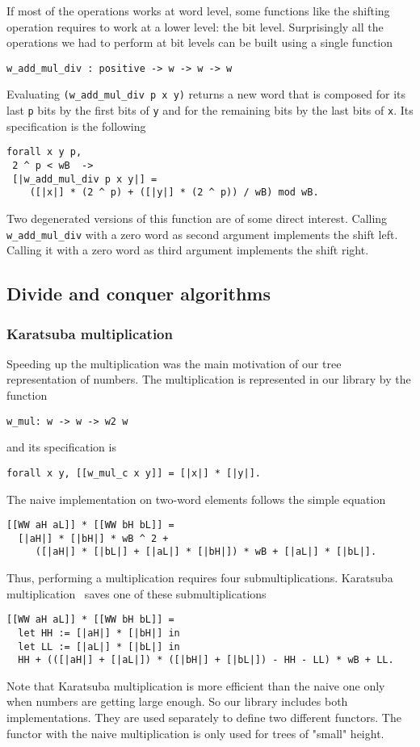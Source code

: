 If most of the operations works at word level, some functions like the
shifting operation requires to work at a lower level: the bit level.
Surprisingly all the operations we had to perform at bit levels can be built
using a single function
\begin{verbatim}
w_add_mul_div : positive -> w -> w -> w
\end{verbatim}
Evaluating  {\tt (w\_add\_mul\_div p x y)} returns a new word that
is composed for its last {\tt p} bits by the first bits of {\tt y}
and for the remaining bits by the last bits of {\tt x}.
Its specification is the following
\begin{verbatim}
forall x y p, 
 2 ^ p < wB  ->
 [|w_add_mul_div p x y|] =
    ([|x|] * (2 ^ p) + ([|y|] * (2 ^ p)) / wB) mod wB.
\end{verbatim}
Two degenerated versions of this function are of some direct interest. Calling
{\tt w\_add\_mul\_div} with a zero word as second argument implements
the shift left. Calling it with a zero word as third argument implements
the shift right.

\subsection{Divide and conquer algorithms}

\subsubsection{Karatsuba multiplication}
Speeding up the multiplication was the main motivation of our 
tree representation of numbers. The multiplication is represented in our library
by the function
\begin{verbatim}
w_mul: w -> w -> w2 w
\end{verbatim}
and its specification is
\begin{verbatim}
forall x y, [[w_mul_c x y]] = [|x|] * [|y|].
\end{verbatim}
The naive implementation on two-word elements follows the simple equation
\begin{verbatim}
[[WW aH aL]] * [[WW bH bL]] =
  [|aH|] * [|bH|] * wB ^ 2 + 
     ([|aH|] * [|bL|] + [|aL|] * [|bH|]) * wB + [|aL|] * [|bL|].
\end{verbatim}
Thus, performing a multiplication requires four submultiplications.
Karatsuba multiplication~\cite{Karat} saves one of these submultiplications
\begin{verbatim}
[[WW aH aL]] * [[WW bH bL]] =
  let HH := [|aH|] * [|bH|] in
  let LL := [|aL|] * [|bL|] in
  HH + (([|aH|] + [|aL|]) * ([|bH|] + [|bL|]) - HH - LL) * wB + LL.
\end{verbatim}
Note that Karatsuba multiplication is more efficient than the naive one
only when numbers are getting large enough. So our library
includes both implementations. They are used separately to define two
different functors. The functor with the naive multiplication is only used 
for trees of "small" height. 

